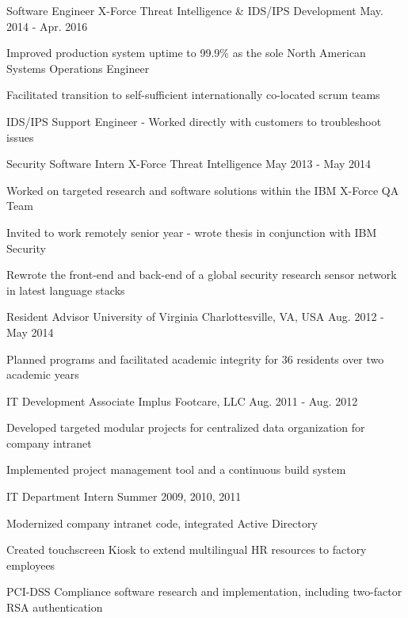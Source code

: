 \begin{cventries}
  \cventry
    {Software Engineer \enskip\textendash\enskip X-Force Threat Intelligence \& IDS/IPS Development}
    {}
    {} %
    {May. 2014 - Apr. 2016}
    {
    \begin{cvitems}
      \item {Improved production system uptime to 99.9\% as the sole North American Systems Operations Engineer}
      \item {Facilitated transition to self-sufficient internationally co-located scrum teams}
      \item {IDS/IPS Support Engineer - Worked directly with customers to troubleshoot issues}
    \end{cvitems}
    }

  \cventry
    {Security Software Intern \enskip\textendash\enskip X-Force Threat Intelligence}
    {}
    {} %
    {May 2013 - May 2014}
    {
    \begin{cvitems}
      \item {Worked on targeted research and software solutions within the IBM X-Force QA Team}
      \item {Invited to work remotely senior year - wrote thesis in conjunction with IBM Security}
      \item {Rewrote the front-end and back-end of a global security research sensor network in latest language stacks}
    \end{cvitems}
    }

  \cventry
    {Resident Advisor}
    {University of Virginia}
    {Charlottesville, VA, USA}
    {Aug. 2012 - May 2014}
    {
      \begin{cvitems}
	      \item {Planned programs and facilitated academic integrity for 36 residents over two academic years}
      \end{cvitems}
    }

  \cventry
    {IT Development Associate}
    {Implus Footcare, LLC}
    {}
    {Aug. 2011 - Aug. 2012}
    {
      \begin{cvitems}
        \item Developed targeted modular projects for centralized data organization for company intranet
        \item Implemented project management tool and a continuous build system
      \end{cvitems}
    }

  \cventry
  {IT Department Intern}
  {}
  {}
  {Summer 2009, 2010, 2011}
  {
    \begin{cvitems}
      \item Modernized company intranet code, integrated Active Directory
      \item Created touchscreen Kiosk to extend multilingual HR resources to factory employees
      \item PCI-DSS Compliance software research and implementation, including two-factor RSA authentication
    \end{cvitems}
  }

\end{cventries}
